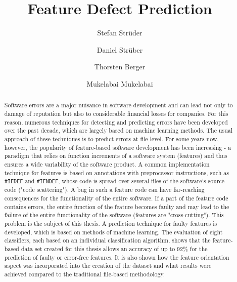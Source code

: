 \documentclass[sigconf]{acmart}
\begin{document}
\title{Feature Defect Prediction}
\renewcommand{\shorttitle}{}

\author{Stefan Strüder}

\author{Daniel Strüber}

\author{Thorsten Berger}

\author{Mukelabai Mukelabai}

\renewcommand{\shortauthors}{}


\begin{abstract}
Software errors are a major nuisance in software development and can lead not only to damage of reputation but also to considerable financial losses for companies. For this reason, numerous techniques for detecting and predicting errors have been developed over the past decade, which are largely based on machine learning methods. The usual approach of these techniques is to predict errors at file level. For some years now, however, the popularity of feature-based software development has been increasing - a paradigm that relies on function increments of a software system (features) and thus ensures a wide variability of the software product. A common implementation technique for features is based on annotations with preprocessor instructions, such as \texttt{\#IFDEF} and \texttt{\#IFNDEF}, whose code is spread over several files of the software's source code ("code scattering"). A bug in such a feature code can have far-reaching consequences for the functionality of the entire software. If a part of the feature code contains errors, the entire function of the feature becomes faulty and may lead to the failure of the entire functionality of the software (features are "cross-cutting"). This problem is the subject of this thesis. A prediction technique for faulty features is developed, which is based on methods of machine learning. The evaluation of eight classifiers, each based on an individual classification algorithm, shows that the feature-based data set created for this thesis allows an accuracy of up to 92\% for the prediction of faulty or error-free features. It is also shown how the feature orientation aspect was incorporated into the creation of the dataset and what results were achieved compared to the traditional file-based methodology.

\end{abstract}
\end{document}
